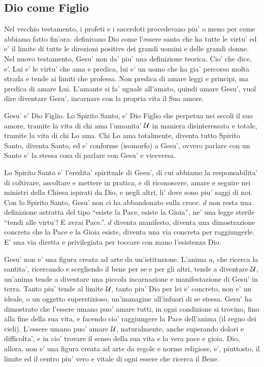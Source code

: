\subsection{Dio come Figlio}

Nel vecchio testamento, i profeti e i sacerdoti procedevano piu' o meno per come abbiamo fatto fin'ora: definivano Dio come l'essere santo che ha tutte le virtu' ed e' il limite di tutte le direzioni positive dei grandi uomini e delle grandi donne. Nel nuovo testamento, Gesu' non da' piu' una definizione teorica. Cio' che dice, e'. Lui e' le virtu' che ama e predica, lui e' un uomo che ha gia' percorso molta strada e tende ai limiti che professa. Non predica di amare leggi e principi, ma predica di amare Lui. L'amante si fa' uguale all'amato, quindi amare Gesu', vuol dire diventare Gesu', incarnare con la propria vita il Suo amore.

Gesu' e' Dio Figlio. Lo Spirito Santo, e' Dio Figlio che perpetua nei secoli il suo amore, tramite la vita di chi ama l'umanita' $\mathcal{U}$ in maniera disinteressata e totale, tramite la vita di chi Lo ama. Chi Lo ama totalmente, diventa tutto Spirito Santo, diventa Santo, ed e' conforme (isomorfo) a Gesu', ovvero parlare con un Santo e' la stessa cosa di parlare con Gesu' e viceversa.

Lo Spirito Santo e' l'eredita' spirituale di Gesu', di cui abbiamo la responsabilita' di coltivare, ascoltare e mettere in pratica, e di riconoscere, amare e seguire nei ministri della Chiesa ispirati da Dio, e negli altri, li' dove sono piu' saggi di noi. Con lo Spirito Santo, Gesu' non ci ha abbandonato sulla croce. $d$ non resta una definizione astratta del tipo ``esiste la Pace, esiste la Gioia'', ne' una legge sterile ``tendi alle virtu'! E avrai Pace.''. $d$ diventa manifesto, diventa una dimostrazione concreta che la Pace e la Gioia esiste, diventa una via concreta per raggiungerle. E' una via diretta e privilegiata per toccare con mano l'esistenza Dio.

Gesu' non e' una figura creata ad arte da un'istituzione.
L'anima $a_i$ che ricerca la santita', ricercando e scegliendo il bene per se e per gli altri, tende a diventare $\mathcal{U}$, un'anima tende a diventare una piccola incarnazione e manifestazione di Gesu' in terra. Tanto piu' tende al limite $\mathcal{U}$, tanto piu' Dio per lei e' concreto, non e' un ideale, o un oggetto superstizioso, un'immagine all'infuori di se stessa. Gesu' ha dimostrato che l'essere umano puo' amare tutti, in ogni condizione si trovino, fino alla fine della sua vita, e facendo cio' raggiungere la Pace dell'anima (il regno dei cieli). L'essere umano puo' amare $\mathcal{U}$, naturalmente, anche superando dolori e difficolta', e in cio' trovare il senso della sua vita e la vera pace e gioia. Dio, allora, non e' una figura creata ad arte da regole e norme religiose, e', piuttosto, il limite ed il centro piu' vero e vitale di ogni essere che ricerca il Bene. 

